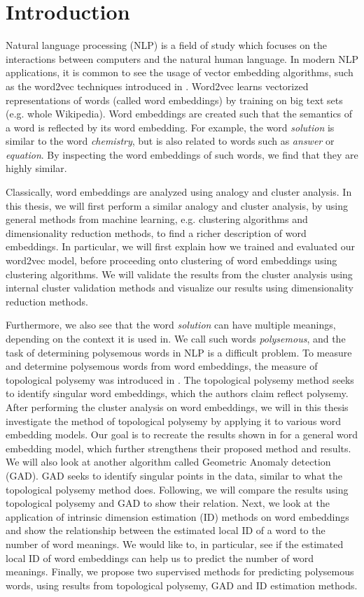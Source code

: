 \chapter{Introduction}
\label{chap:introduction}
Natural language processing (NLP) is a field of study which focuses on the interactions between computers and the natural human language. In modern NLP applications, it is common to see the usage of vector embedding algorithms, such as the word2vec techniques introduced in \cite{mikolov2013a}. Word2vec learns vectorized representations of words (called word embeddings) by training on big text sets (e.g. whole Wikipedia). Word embeddings are created such that the semantics of a word is reflected by its word embedding. For example, the word \textit{solution} is similar to the word \textit{chemistry}, but is also related to words such as \textit{answer} or \textit{equation}. By inspecting the word embeddings of such words, we find that they are highly similar.

Classically, word embeddings are analyzed using analogy and cluster analysis. In this thesis, we will first perform a similar analogy and cluster analysis, by using general methods from machine learning, e.g. clustering algorithms and dimensionality reduction methods, to find a richer description of word embeddings. In particular, we will first explain how we trained and evaluated our word2vec model, before proceeding onto clustering of word embeddings using clustering algorithms. We will validate the results from the cluster analysis using internal cluster validation methods and visualize our results using dimensionality reduction methods.

Furthermore, we also see that the word \textit{solution} can have multiple meanings, depending on the context it is used in. We call such words \textit{polysemous}, and the task of determining polysemous words in NLP is a difficult problem. To measure and determine polysemous words from word embeddings, the measure of topological polysemy was introduced in \cite{jakubowski2020topology}. The topological polysemy method seeks to identify singular word embeddings, which the authors claim reflect polysemy. After performing the cluster analysis on word embeddings, we will in this thesis investigate the method of topological polysemy by applying it to various word embedding models. Our goal is to recreate the results shown in \cite{jakubowski2020topology} for a general word embedding model, which further strengthens their proposed method and results. We will also look at another algorithm called Geometric Anomaly detection (GAD). GAD seeks to identify singular points in the data, similar to what the topological polysemy method does. Following, we will compare the results using topological polysemy and GAD to show their relation. Next, we look at the application of intrinsic dimension estimation (ID) methods on word embeddings and show the relationship between the estimated local ID of a word to the number of word meanings. We would like to, in particular, see if the estimated local ID of word embeddings can help us to predict the number of word meanings. Finally, we propose two supervised methods for predicting polysemous words, using results from topological polysemy, GAD and ID estimation methods.

